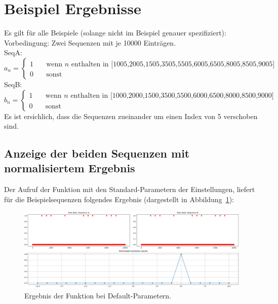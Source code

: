 \section{Beispiel Ergebnisse}
Es gilt für alle Beispiele (solange nicht im Beispiel genauer spezifiziert):\\
Vorbedingung: Zwei Sequenzen mit je 10000 Einträgen. \\
SeqA:
\[ a_{n} =
  \begin{cases}
    1       & \quad \text{wenn } n \text{ enthalten in [1005,2005,1505,3505,5505,6005,6505,8005,8505,9005]}\\
    0  & \quad \text{sonst}
  \end{cases}
\]
SeqB:
\[ b_{n} =
  \begin{cases}
    1       & \quad \text{wenn } n \text{ enthalten in [1000,2000,1500,3500,5500,6000,6500,8000,8500,9000]}\\
    0  & \quad \text{sonst}
  \end{cases}
\]
Es ist ersichlich, dass die Sequenzen zueinander um einen Index von 5 verschoben sind.

\subsection{Anzeige der beiden Sequenzen mit normalisiertem Ergebnis}
Der Aufruf der Funktion mit den Standard-Parametern der Einstellungen, liefert für die Beispielsequenzen folgendes Ergebnis (dargestellt in Abbildung~\ref{fig:correlationDefaultParams}):
\begin{figure}[H]
    \includegraphics[width=\linewidth]{pythonImplementation/images/correlationDefaultParams.PNG}
    \caption[Ergebnis: Default-Parameter]{Ergebnis der Funktion bei Default-Parametern\footnotemark.}
    \label{fig:correlationDefaultParams}
\end{figure}

